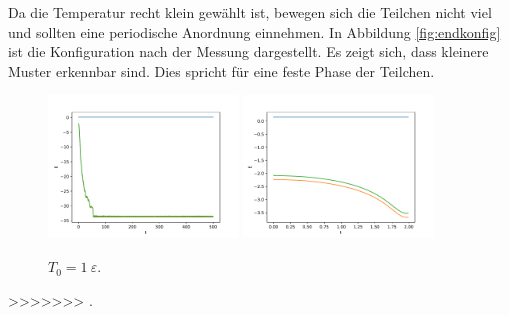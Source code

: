 Da die Temperatur recht klein gewählt ist, bewegen sich die Teilchen nicht viel
und sollten eine periodische Anordnung einnehmen.
In Abbildung \ref{fig:endkonfig} ist die Konfiguration nach der Messung dargestellt.
Es zeigt sich, dass kleinere Muster erkennbar sind.
Dies spricht für eine feste Phase der Teilchen.
\begin{figure}
    \centering
    \includegraphics[width=0.45\textwidth]{A1/build/aequi_isokinetisch001_E.pdf}
    \includegraphics[width=0.45\textwidth]{A1/build/aequi_isokinetisch001_EE.pdf}
    \caption{$T_\text{0} = 1\:\varepsilon$.}
    \label{fig:isoE}
\end{figure}
>>>>>>> .
